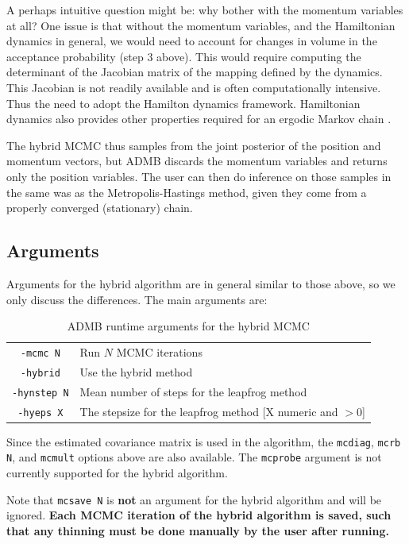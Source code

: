 \documentclass{article}\usepackage[]{graphicx}\usepackage[]{color}
\begin{document}
A perhaps intuitive question might be: why bother with the
momentum variables at all? One issue is that without the
momentum variables, and the Hamiltonian dynamics in general,
we would need to account for changes in volume in the
acceptance probability (step 3 above)\cite{brooks2011}. This
would require computing the determinant of the Jacobian
matrix of the mapping defined by the dynamics. This Jacobian
is not readily available and is often computationally
intensive. Thus the need to adopt the Hamilton dynamics
framework.  Hamiltonian dynamics also provides other
properties required for an ergodic Markov chain
\cite{brooks2011}.

The hybrid MCMC thus samples from the joint posterior of the
position and momentum vectors, but ADMB discards the
momentum variables and returns only the position
variables. The user can then do inference on those samples
in the same was as the Metropolis-Hastings method, given
they come from a properly converged (stationary) chain.

\subsection{Arguments}
Arguments for the hybrid algorithm are in general similar to
those above, so we only discuss the differences. The main
arguments are:
\begin{table}[H]
  \centering
  \begin{tabular}[h]{|cl|}
    \hline
    \texttt{-mcmc N} & Run $N$ MCMC iterations\\
    \texttt{-hybrid} & Use the hybrid method\\
    \texttt{-hynstep N} & Mean number of steps for the leapfrog method\\
    \texttt{-hyeps X} & The stepsize for the leapfrog method [X numeric and $>0$]\\
    \hline
  \end{tabular}
  \caption{ADMB runtime arguments for the hybrid MCMC}
  \label{tab:hy_args}
\end{table}
Since the estimated covariance matrix is used in the
algorithm, the \texttt{mcdiag}, \texttt{mcrb N}, and
\texttt{mcmult} options above are also available. The
\texttt{mcprobe} argument is not currently supported for the
hybrid algorithm.

Note that \texttt{mcsave N} is \textbf{not} an argument for
the hybrid algorithm and will be ignored. \textbf{Each MCMC
iteration of the hybrid algorithm is saved, such that any
thinning must be done manually by the user after running.}
\end{document}

